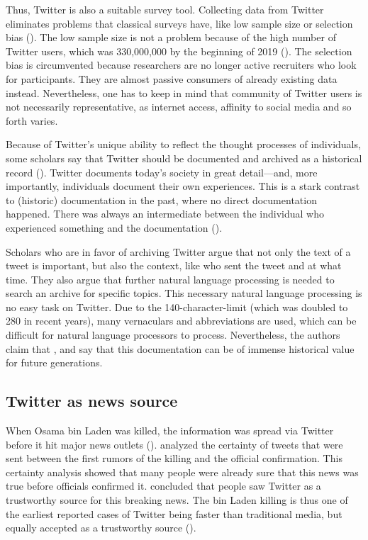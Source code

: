 Thus, Twitter is also a suitable survey tool. Collecting data from Twitter eliminates problems that classical surveys have, like low sample size or selection bias (\cite{takabeTwitterSurveyTool2016}). The low sample size is not a problem because of the high number of Twitter users, which was 330,000,000 by the beginning of 2019 (\cite{TwitterMonthlyActive}). The selection bias is circumvented because researchers are no longer active recruiters who look for participants. They are almost passive consumers of already existing data instead. Nevertheless, one has to keep in mind that community of Twitter users is not necessarily representative, as internet access, affinity to social media and so forth varies. %

Because of Twitter's unique ability to reflect the thought processes of individuals, some scholars say that Twitter should be documented and archived as a historical record (\cite{risse2014documenting}). Twitter documents today's society in great detail---and, more importantly, individuals document their own experiences. This is a stark contrast to (historic) documentation in the past, where no direct documentation happened. There was always an intermediate between the individual who experienced something and the documentation (\citeauthor{risse2014documenting}).

Scholars who are in favor of archiving Twitter argue that not only the text of a tweet is important, but also the context, like who sent the tweet and at what time. They also argue that further natural language processing is needed to search an archive for specific topics. This necessary natural language processing is no easy task on Twitter. Due to the 140-character-limit (which was doubled to 280 in recent years), many vernaculars and abbreviations are used, which can be difficult for natural language processors to process. Nevertheless, the authors claim that  \parencite[9]{risse2014documenting}, and say that this documentation can be of immense historical value for future generations.

\subsection{Twitter as news source}  %
When Osama bin Laden was killed, the information was spread via Twitter before it hit major news outlets (\cite{hu2012breaking}). \citeauthor{hu2012breaking} analyzed the certainty of tweets that were sent between the first rumors of the killing and the official confirmation. This certainty analysis showed that many people were already sure that this news was true before officials confirmed it. \citeauthor{hu2012breaking} concluded that people saw Twitter as a trustworthy source for this breaking news. The bin Laden killing is thus one of the earliest reported cases of Twitter being faster than traditional media, but equally accepted as a trustworthy source (\cite[2751]{hu2012breaking}).

